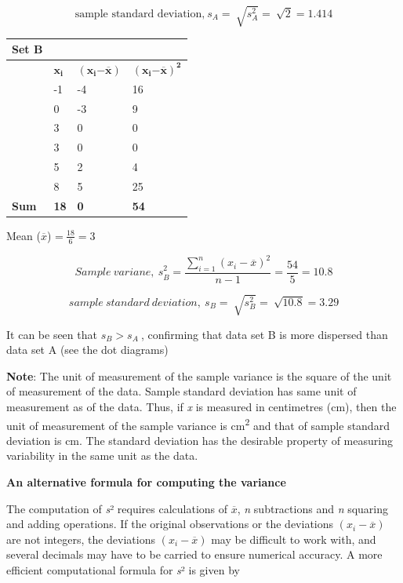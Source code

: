 \documentclass[
]{book}
\renewenvironment{quote}{\begin{VF}}{\end{VF}}
\begin{document}
\[\text{sample standard deviation,}\ s_{A} = \ \sqrt{s_{A}^{2}} = \ \sqrt{2} = 1.414\]

\begin{longtable}[]{@{}llll@{}}
\toprule
\textbf{Set B} & & & \\
\midrule
\endhead
& \(\mathbf{x}_{\mathbf{i}}\) & \(\left( \mathbf{x}_{\mathbf{i}}\mathbf{-}\overline{\mathbf{x}} \right)\) & \(\left( \mathbf{x}_{\mathbf{i}}\mathbf{-}\overline{\mathbf{x}} \right)^{\mathbf{2}}\) \\
& -1 & -4 & 16 \\
& 0 & -3 & 9 \\
& 3 & 0 & 0 \\
& 3 & 0 & 0 \\
& 5 & 2 & 4 \\
& 8 & 5 & 25 \\
\textbf{Sum} & \textbf{18} & \textbf{0} & \textbf{54} \\
\bottomrule
\end{longtable}

Mean (\(\overline{x}\)) =\(\ \frac{18}{6} = 3\)

\[{Sample\ variane,\ s}_{B}^{2} = \frac{\sum_{i = 1}^{n}\left( x_{i} - \overline{x} \right)^{2}}{n - 1} = \frac{54}{5} = 10.8\]

\[sample\ standard\ deviation,\ s_{B} = \ \sqrt{s_{B}^{2}} = \ \sqrt{10.8} = 3.29\]

It can be seen that \(s_{B} > s_{A}\ \), confirming that data set B is
more dispersed than data set A (see the dot diagrams)

\begin{quote}
\textbf{Note}: The unit of measurement of the sample variance is the square
of the unit of measurement of the data. Sample standard deviation has
same unit of measurement as of the data. Thus, if \emph{x} is measured in
centimetres (cm), then the unit of measurement of the sample variance is
cm\textsuperscript{2} and that of sample standard deviation is cm. The standard
deviation has the desirable property of measuring variability in the
same unit as the data.
\end{quote}

\textbf{An alternative formula for computing the variance}

The computation of \emph{s}² requires calculations of \(\overline{x}\), \emph{n}
subtractions and \emph{n} squaring and adding operations. If the original
observations or the deviations \(\left( x_{i} - \overline{x} \right)\) are
not integers, the deviations \(\left( x_{i} - \overline{x} \right)\) may
be difficult to work with, and several decimals may have to be carried
to ensure numerical accuracy. A more efficient computational formula for
\emph{s}² is given by
\end{document}
